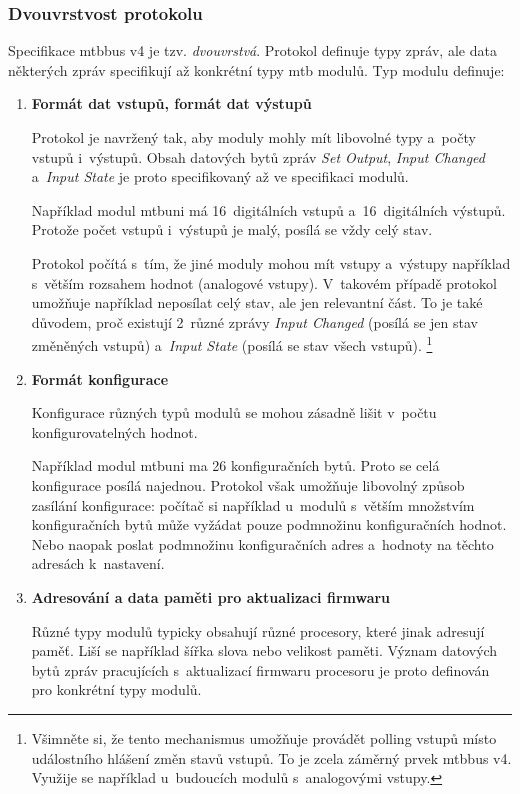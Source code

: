 \subsubsection{\textbf{Dvouvrstvost protokolu}}

Specifikace \gls{mtbbus} v4 je tzv. \textit{dvouvrstvá}. Protokol definuje
typy zpráv, ale data některých zpráv specifikují až konkrétní typy \gls{mtb}
modulů. Typ modulu definuje:

\begin{enumerate}
\item \textbf{Formát dat vstupů, formát dat výstupů}

Protokol je navržený tak, aby moduly mohly mít libovolné typy a~počty vstupů
i~výstupů. Obsah datových bytů zpráv \textit{Set Output}, \textit{Input
Changed} a~\textit{Input State} je proto specifikovaný až ve specifikaci modulů.

Například modul \gls{mtbuni} má 16~digitálních vstupů a~16~digitálních výstupů.
Protože počet vstupů i~výstupů je malý, posílá se vždy celý stav.

Protokol počítá s~tím, že jiné moduly mohou mít vstupy a~výstupy například
s~větším rozsahem hodnot (analogové vstupy). V~takovém případě protokol
umožňuje například neposílat celý stav, ale jen relevantní část. To je také
důvodem, proč existují 2~různé zprávy
\textit{Input Changed} (posílá se jen stav změněných vstupů)
a~\textit{Input State} (posílá se stav všech vstupů).
\footnote{Všimněte si, že tento mechanismus umožňuje provádět polling
vstupů místo událostního hlášení změn stavů vstupů. To je zcela záměrný prvek
\gls{mtbbus} v4. Využije se například u~budoucích modulů s~analogovými vstupy.}

\item \textbf{Formát konfigurace}

Konfigurace různých typů modulů se mohou zásadně lišit v~počtu
konfigurovatelných hodnot.

Například modul \gls{mtbuni} ma 26 konfiguračních bytů. Proto se celá
konfigurace posílá najednou. Protokol však umožňuje libovolný způsob
zasílání konfigurace: počítač si například u~modulů s~větším množstvím konfiguračních
bytů může vyžádat pouze podmnožinu konfiguračních hodnot. Nebo naopak poslat
podmnožinu konfiguračních adres a~hodnoty na těchto adresách k~nastavení.

\item \textbf{Adresování a data paměti pro aktualizaci firmwaru}

Různé typy modulů typicky obsahují různé procesory, které jinak adresují paměť.
Liší se například šířka slova nebo velikost paměti. Význam datových bytů
zpráv pracujících s~aktualizací firmwaru procesoru je proto definován pro
konkrétní typy modulů.

\end{enumerate}

